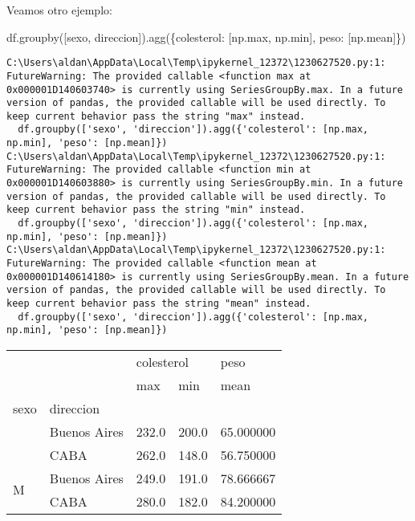 \documentclass[
  letterpaper,
  DIV=11,
  numbers=noendperiod]{scrreprt}
\newenvironment{Shaded}{\begin{snugshade}}{\end{snugshade}}
\newcommand{\BuiltInTok}[1]{\textcolor[rgb]{0.00,0.23,0.31}{#1}}
\newcommand{\NormalTok}[1]{\textcolor[rgb]{0.00,0.23,0.31}{#1}}
\newcommand{\StringTok}[1]{\textcolor[rgb]{0.13,0.47,0.30}{#1}}
\begin{document}
Veamos otro ejemplo:

\begin{Shaded}
\begin{Highlighting}[]
\NormalTok{df.groupby([}\StringTok{\textquotesingle{}sexo\textquotesingle{}}\NormalTok{, }\StringTok{\textquotesingle{}direccion\textquotesingle{}}\NormalTok{]).agg(\{}\StringTok{\textquotesingle{}colesterol\textquotesingle{}}\NormalTok{: [np.}\BuiltInTok{max}\NormalTok{, np.}\BuiltInTok{min}\NormalTok{], }\StringTok{\textquotesingle{}peso\textquotesingle{}}\NormalTok{: [np.mean]\})}
\end{Highlighting}
\end{Shaded}

\begin{verbatim}
C:\Users\aldan\AppData\Local\Temp\ipykernel_12372\1230627520.py:1: FutureWarning: The provided callable <function max at 0x000001D140603740> is currently using SeriesGroupBy.max. In a future version of pandas, the provided callable will be used directly. To keep current behavior pass the string "max" instead.
  df.groupby(['sexo', 'direccion']).agg({'colesterol': [np.max, np.min], 'peso': [np.mean]})
C:\Users\aldan\AppData\Local\Temp\ipykernel_12372\1230627520.py:1: FutureWarning: The provided callable <function min at 0x000001D140603880> is currently using SeriesGroupBy.min. In a future version of pandas, the provided callable will be used directly. To keep current behavior pass the string "min" instead.
  df.groupby(['sexo', 'direccion']).agg({'colesterol': [np.max, np.min], 'peso': [np.mean]})
C:\Users\aldan\AppData\Local\Temp\ipykernel_12372\1230627520.py:1: FutureWarning: The provided callable <function mean at 0x000001D140614180> is currently using SeriesGroupBy.mean. In a future version of pandas, the provided callable will be used directly. To keep current behavior pass the string "mean" instead.
  df.groupby(['sexo', 'direccion']).agg({'colesterol': [np.max, np.min], 'peso': [np.mean]})
\end{verbatim}

\begin{longtable}[]{@{}lllll@{}}
\toprule\noalign{}
& & \multicolumn{2}{l}{%
colesterol} & peso \\
& & max & min & mean \\
sexo & direccion & & & \\
\midrule\noalign{}
\endhead
\bottomrule\noalign{}
\endlastfoot
\multirow{2}{=}{F} & Buenos Aires & 232.0 & 200.0 & 65.000000 \\
& CABA & 262.0 & 148.0 & 56.750000 \\
\multirow{2}{=}{M} & Buenos Aires & 249.0 & 191.0 & 78.666667 \\
& CABA & 280.0 & 182.0 & 84.200000 \\
\end{longtable}
\end{document}
